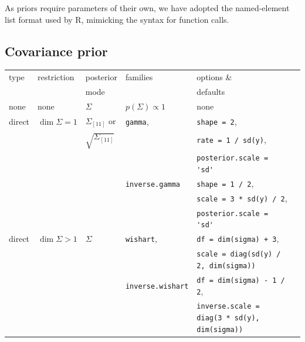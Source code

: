 \documentclass[10pt]{article}
\let\proglang=\textsf
\newcommand{\code}[1]{\texttt{#1}}
\begin{document}
As priors require parameters of their own, we have adopted the
named-element list format used by \proglang{R}, mimicking the syntax for function
calls.

\subsection[Covariance prior]{Covariance prior}

\begin{table}
\begin{center}{\scriptsize
\begin{tabular}{llllll}
type & restriction & posterior & families & options \& \\ 
& & mode & & defaults \\ \hline
\vspace{.05in} none & none & $\Sigma$ & $p(\Sigma) \propto 1$ & none \\
direct & $\dim{\Sigma}=1$ & $\Sigma_{[11]}$ or &
\code{gamma}, & \code{shape = 2}, \\
& & $\sqrt{\Sigma_{[11]}}$ & & \code{rate = 1 / sd(y)}, \\
& & & & \code{posterior.scale = }\verb/'sd'/ \\
& & &\code{inverse.gamma} & \code{shape = 1 / 2}, \\
& & & & \code{scale = 3 * sd(y) / 2}, \\ 
& & & & \code{posterior.scale = }\verb/'sd'/ \\
direct & $\dim{\Sigma} > 1$ & $\Sigma$ & \code{wishart}, & \code{df =
  dim(sigma) + 3}, \\
& & & & \code{scale = diag(sd(y) / 2, dim(sigma))} \\
& & & \code{inverse.wishart} & \code{df = dim(sigma) - 1 / 2}, \\ 
& & & & \code{inverse.scale =
diag(3 * sd(y), dim(sigma))} \\


\end{tabular}}
\end{center}
\end{table}
\end{document}
